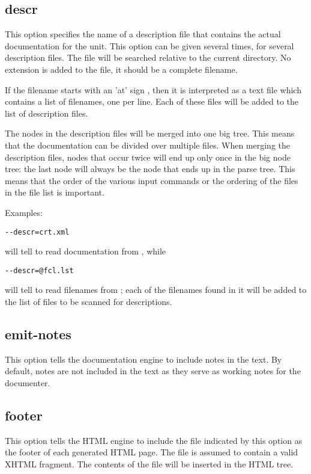 \subsection{descr}
\label{suse:descr}
This option specifies the name of a description file that contains the 
actual documentation for the unit. This option can be given several 
times, for several description files. The file will be searched relative to
the current directory. No extension is added to the file, it should be a
complete filename.

If the filename starts with an 'at' sign , then it is interpreted
as a text file which contains a list of filenames, one per line. 
Each of these files will be added to the list of description files.

The nodes in the description files will be merged into one big tree. This
means that the documentation can be divided over multiple files. When
merging the description files, nodes that occur twice will end up only once
in the big node tree: the last node will always be the node that ends up in
the parse tree. This means that the order of the various input commands or
the ordering of the files in the file list is important.

Examples:
\begin{verbatim}
--descr=crt.xml 
\end{verbatim}
will tell \fpdoc to read documentation from , while
\begin{verbatim}
--descr=@fcl.lst 
\end{verbatim}
will tell \fpdoc to read filenames from ; each of the
filenames found in it will be added to the list of files to be scanned for
descriptions.

\subsection{emit-notes}
\label{suse:emit-notes}
This option tells the documentation engine to include notes in the text.
By default, notes are not included in the text as they serve as working 
notes for the documenter.

\subsection{footer}
\label{suse:footer}
This option tells the HTML engine to include the file indicated by this
option as the footer of each generated HTML page. The file is assumed to
contain a valid XHTML fragment. The contents of the file will be inserted 
in the HTML tree.

